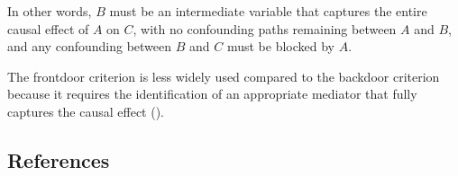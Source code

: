 \documentclass[
  single column]{article}
\begin{document}
In other words, \(B\) must be an intermediate variable that captures the
entire causal effect of \(A\) on \(C\), with no confounding paths
remaining between \(A\) and \(B\), and any confounding between \(B\) and
\(C\) must be blocked by \(A\).

The frontdoor criterion is less widely used compared to the backdoor
criterion because it requires the identification of an appropriate
mediator that fully captures the causal effect
().

\newpage{}

\subsection{References}\label{references}

\label{refs}
\end{document}
